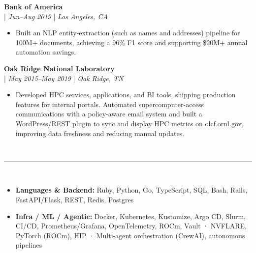 \documentclass[11pt,a4paper]{article}
\newcommand{\resumesection}[1]{
    \vspace{3pt}                                    %
    \noindent{\fontsize{13.65}{16}\selectfont\textbf{#1}}\\[-8pt]                    %
    \noindent\textcolor{gray}{\rule{\textwidth}{2pt}}\\[-5pt]  %
    \vspace{-8pt}                                   %
}
\newcommand{\regbullet}[1]{
    \item {\fontsize{10}{12}\selectfont #1}
}
\begin{document}
\vspace{8pt}
\noindent\textbf{Bank of America}\\
  |  {\fontsize{10}{12}\selectfont\textit{Jun--Aug 2019}}  |  {\fontsize{10}{12}\selectfont\textit{Los Angeles, CA}}
\begin{itemize}[leftmargin=18pt,itemsep=1pt,topsep=0pt]
\regbullet{Built an NLP entity-extraction (such as names and addresses) pipeline for 100M+ documents, achieving a 96\% F1 score and supporting \$20M+ annual automation savings.}
\end{itemize}

\vspace{8pt}
\noindent\textbf{Oak Ridge National Laboratory}\\
  |  {\fontsize{10}{12}\selectfont\textit{May 2015--May 2019}}  |  {\fontsize{10}{12}\selectfont\textit{Oak Ridge, TN}}
\begin{itemize}[leftmargin=18pt,itemsep=1pt,topsep=0pt]
\regbullet{Developed HPC services, applications, and BI tools, shipping production features for internal portals. Automated supercomputer-access communications with a policy-aware email system and built a WordPress/REST plugin to sync and display HPC metrics on olcf.ornl.gov, improving data freshness and reducing manual updates.}
\end{itemize}
\vspace{8pt}




\resumesection{Skills}

\begin{itemize}[leftmargin=18pt,itemsep=1pt,topsep=0pt]
\regbullet{\textbf{Languages \& Backend:} Ruby, Python, Go, TypeScript, SQL, Bash, Rails, FastAPI/Flask, REST, Redis, Postgres}

\regbullet{\textbf{Infra / ML / Agentic:} Docker, Kubernetes, Kustomize, Argo CD, Slurm, CI/CD, Prometheus/Grafana, OpenTelemetry, ROCm, Vault · NVFLARE, PyTorch (ROCm), HIP · Multi-agent orchestration (CrewAI), autonomous pipelines}
\end{itemize}
\vspace{4pt}
\end{document}
